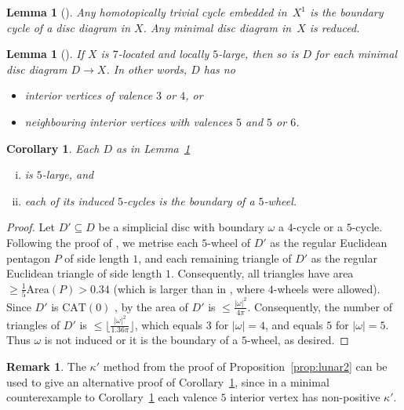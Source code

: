 \documentclass[a4paper,12pt,leqno]{amsart}
\newtheorem{lemma}[thm]{Lemma}
\newtheorem{cor}[thm]{Corollary}
\theoremstyle{definition}
\newtheorem{remark}[thm]{Remark}
\begin{document}
\begin{lemma}[{\cite[Lem~2.16 and 2.17]{MW}}] 
\label{lem:VK}
Any homotopically trivial cycle embedded in~$X^1$ is the boundary cycle of a disc diagram in $X$. Any minimal disc diagram in~$X$ is reduced.
\end{lemma}

\begin{lemma}[{\cite[Thm~B]{HL}}] 
\label{lem:main interior valence}
If $X$ is $7$-located and locally $5$-large, then so is $D$ for each minimal disc diagram $D\to X$. In other words, $D$ has no
\begin{itemize}
        \item interior vertices of valence $3$ or $4$, or
       \item neighbouring interior vertices with valences $5$ and $5$ or $6$.
\end{itemize}
\end{lemma}

\begin{cor}
\label{cor:5large}
Each $D$ as in Lemma~\ref{lem:main interior valence} 
\begin{enumerate}[(i)]
\item
is $5$-large, and
\item 
each of its induced $5$-cycles is the boundary of a $5$-wheel.
\end{enumerate}
\end{cor}

\begin{proof} Let $D'\subseteq D$ be a simplicial disc with boundary $\omega$ a $4$-cycle or a $5$-cycle. Following the proof of \cite[Cor~4.7]{HL}, we metrise each $5$-wheel of $D'$ as the regular Euclidean pentagon $P$ of side length $1$, and each remaining triangle of $D'$ as the regular Euclidean triangle of side length $1$. Consequently, all triangles have area $\geq \frac{1}{5}\mathrm{Area}(P)>0.34$ (which is larger than in \cite[Cor~4.7]{HL}, where $4$-wheels were allowed). Since $D'$ is $\mathrm{CAT}(0)$ \cite[Thm~4.6]{HL}, by \cite[III.2.17]{BH} the area of $D'$ is $\leq \frac{|\omega|^2}{4\pi}$. Consequently, the number of triangles of $D'$ is $\leq\Big \lfloor\frac{|\omega|^2}{1.36\pi}\Big \rfloor$, which equals $3$ for $|\omega|=4$, and equals $5$ for $|\omega|=5$. Thus $\omega$ is not induced or it is the boundary of a $5$-wheel, as desired.
\end{proof}

\begin{remark}
The $\kappa'$ method from the proof of Proposition~\ref{prop:lunar2} can be used to give an alternative proof of Corollary~\ref{cor:5large}, since in a minimal counterexample to Corollary~\ref{cor:5large} each valence $5$ interior vertex has non-positive $\kappa'$.
\end{remark}
\end{document}
